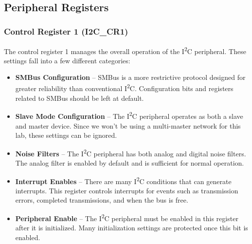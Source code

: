 \documentclass[11pt,fleqn]{book} %
\begin{document}
\subsection{Peripheral Registers}
    \subsubsection{Control Register 1 (I2C\_CR1)}
    The control register 1 manages the overall operation of the I\textsuperscript{2}C peripheral. These settings fall into a few different categories:
    \begin{itemize}
        \item \textbf{SMBus Configuration} -- SMBus is a more restrictive protocol designed for greater reliability than conventional I\textsuperscript{2}C. Configuration bits and registers related to SMBus should be left at default. 
        \item \textbf{Slave Mode Configuration} -- The I\textsuperscript{2}C peripheral operates as both a slave and master device. Since we won't be using a multi-master network for this lab, these settings can be ignored. 
        \item \textbf{Noise Filters} -- The I\textsuperscript{2}C peripheral has both analog and digital noise filters. The analog filter is enabled by default and is sufficient for normal operation. 
        \item \textbf{Interrupt Enables} -- There are many I\textsuperscript{2}C conditions that can generate interrupts. This register controls interrupts for events such as transmission errors, completed transmissions, and when the bus is free. 
        \item \textbf{Peripheral Enable} -- The I\textsuperscript{2}C peripheral must be enabled in this register after it is initialized. Many initialization settings are protected once this bit is enabled.
    \end{itemize}  
    
\end{document}
